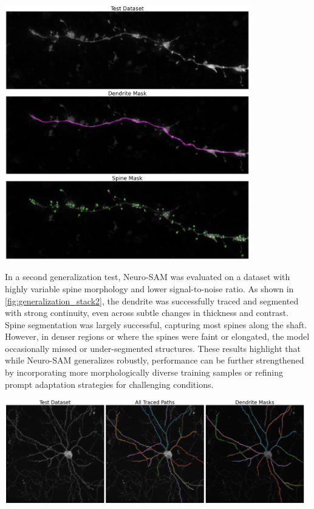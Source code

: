 \begin{center}
\includegraphics[width=0.8\textwidth]{figures/47_generalization_stack2.png}
\label{fig:generalization_stack2}
\end{center}

In a second generalization test, Neuro-\gls{SAM} was evaluated on a dataset with highly variable spine morphology and lower signal-to-noise ratio. As shown in \autoref{fig:generalization_stack2}, the dendrite was successfully traced and segmented with strong continuity, even across subtle changes in thickness and contrast. Spine segmentation was largely successful, capturing most spines along the shaft. However, in denser regions or where the spines were faint or elongated, the model occasionally missed or under-segmented structures. These results highlight that while Neuro-\gls{SAM} generalizes robustly, performance can be further strengthened by incorporating more morphologically diverse training samples or refining prompt adaptation strategies for challenging conditions.

\begin{center}  
\includegraphics[width=0.98\textwidth]{figures/48_generalization_stack3.png}  
\label{fig:generalization_stack3}  
\end{center}  

